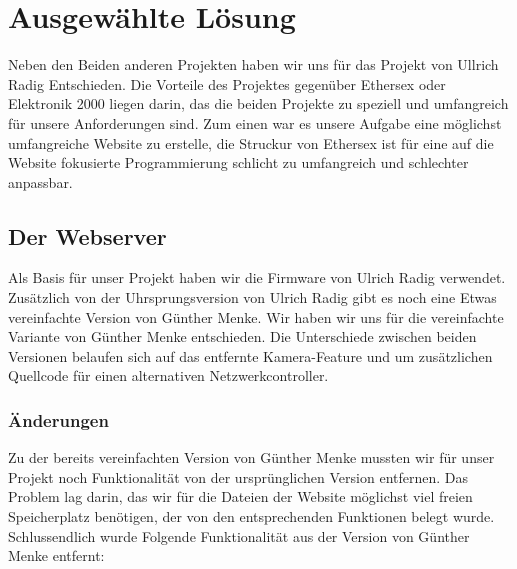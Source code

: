 \chapter{Ausgewählte Lösung}

Neben den Beiden anderen Projekten haben wir uns für das Projekt von Ullrich
Radig Entschieden. Die Vorteile des Projektes gegenüber Ethersex oder Elektronik
2000 liegen darin, das die beiden Projekte zu speziell und umfangreich für unsere
Anforderungen sind. Zum einen war es unsere Aufgabe eine möglichst umfangreiche
Website zu erstelle, die Struckur von Ethersex ist für eine auf die Website
fokusierte Programmierung schlicht zu umfangreich und schlechter anpassbar.

\section{Der Webserver}

Als Basis für unser Projekt haben wir die Firmware von Ulrich Radig verwendet.
Zusätzlich von der Uhrsprungsversion von Ulrich Radig gibt es noch eine Etwas
vereinfachte Version von Günther Menke. Wir haben wir uns für die vereinfachte
Variante von Günther Menke entschieden. Die Unterschiede zwischen beiden
Versionen belaufen sich auf das entfernte Kamera-Feature und um
zusätzlichen Quellcode für einen alternativen Netzwerkcontroller.

\subsection{Änderungen}

Zu der bereits vereinfachten Version von Günther Menke mussten wir für unser
Projekt noch Funktionalität von der ursprünglichen Version entfernen. Das
Problem lag darin, das wir für die Dateien der Website möglichst viel freien
Speicherplatz benötigen, der von den entsprechenden Funktionen belegt wurde.
Schlussendlich wurde Folgende Funktionalität aus der Version von Günther Menke
entfernt:

